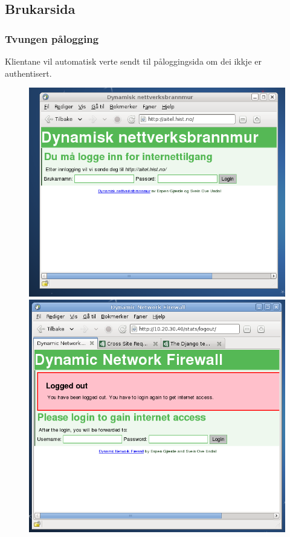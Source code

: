 \documentclass[nynorsk,14pt]{beamer}
\begin{document}
\subsection*{Brukarsida}
\begin{frame} %
	\frametitle{Tvungen pålogging}
	\small{Klientane vil automatisk verte sendt til påloggingsida om dei ikkje er authentisert.}
	\begin{figure}
	\includegraphics[scale=0.24]{imgs/innlogging.png} 
	\includegraphics[scale=0.21]{imgs/user_logedout.png}
	\end{figure}
\end{frame}
\end{document}
